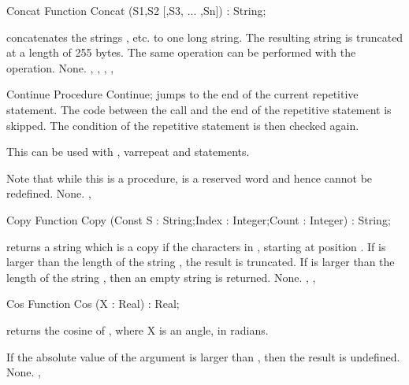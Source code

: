 
\begin{function}{Concat}
\Declaration
Function Concat (S1,S2 [,S3, ... ,Sn]) : String;

\Description
{} concatenates the strings , etc. to one long
string. The resulting string is truncated at a length of 255 bytes.
The same operation can be performed with the \var{+} operation.
\Errors
None.
\SeeAlso
{}, , , , 
\end{function}


\begin{procedure}{Continue}
\Declaration
Procedure Continue;
\Description
{} jumps to the end of the current repetitive statement.
The code between the  call and the end of the repetitive
statement is skipped. The condition of the repetitive statement is then
checked again.

This can be used with , var{repeat} and  statements.

Note that while this is a procedure,  is a reserved word
and hence cannot be redefined.
\Errors
None.
\SeeAlso
{}, 
\end{procedure}



\begin{function}{Copy}
\Declaration
Function Copy (Const S : String;Index : Integer;Count : Integer) : String;

\Description
{} returns a string which is a copy if the  characters
in , starting at position . If  is larger than
the length of the string , the result is truncated.
If  is larger than the length of the string , then an
empty string is returned.
\Errors
None.
\SeeAlso
{}, , 
\end{function}


\begin{function}{Cos}
\Declaration
Function Cos (X : Real) : Real;

\Description
{} returns the cosine of , where X is an angle, in radians.

If the absolute value of the argument is larger than , then the
result is undefined.
\Errors
None.
\SeeAlso
{}, 
\end{function}

